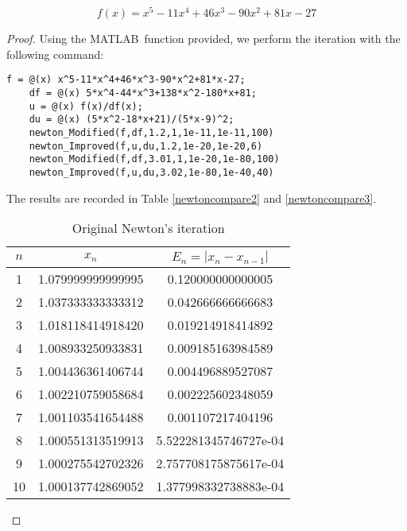 \begin{enumerate}
	\[ f(x)=x^5 - 11x^4 + 46x^3 - 90x^2 + 81x - 27 \]
	\begin{proof}
	Using the MATLAB\texttrademark\ function provided, we perform the iteration with the following command:
	\begin{lstlisting}[style=Matlab-editor]
	f = @(x) x^5-11*x^4+46*x^3-90*x^2+81*x-27;
	df = @(x) 5*x^4-44*x^3+138*x^2-180*x+81;
	u = @(x) f(x)/df(x);
	du = @(x) (5*x^2-18*x+21)/(5*x-9)^2;
	newton_Modified(f,df,1.2,1,1e-11,1e-11,100)
	newton_Improved(f,u,du,1.2,1e-20,1e-20,6)
	newton_Modified(f,df,3.01,1,1e-20,1e-80,100)
	newton_Improved(f,u,du,3.02,1e-80,1e-40,40)
	\end{lstlisting}
	The results are recorded in Table \ref{newtoncompare2} and \ref{newtoncompare3}.
	\ifnum{}
		\begin{table}[H]
		\centering
		\begin{subtable}[t]{.8\textwidth}
	\else
		\begin{table}[htbp]
		\begin{subtable}[t]{.49\linewidth}
	\fi	
			\centering
			\caption{Original Newton's iteration}
			\begin{tabular}[t]{|c|c|c|}
			\hline
			$n$	&	\(x_n\)				&	\(E_n=|x_n-x_{n-1}|\)	\\	\hline
			\footnotesize	1	&	\footnotesize	1.079999999999995	&	\footnotesize	0.120000000000005	\\	\hline
			\footnotesize	2	&	\footnotesize	1.037333333333312	&	\footnotesize	0.042666666666683	\\	\hline
			\footnotesize	3	&	\footnotesize	1.018118414918420	&	\footnotesize	0.019214918414892	\\	\hline
			\footnotesize	4	&	\footnotesize	1.008933250933831	&	\footnotesize	0.009185163984589	\\	\hline
			\footnotesize	5	&	\footnotesize	1.004436361406744	&	\footnotesize	0.004496889527087	\\	\hline
			\footnotesize	6	&	\footnotesize	1.002210759058684	&	\footnotesize	0.002225602348059	\\	\hline
			\footnotesize	7	&	\footnotesize	1.001103541654488	&	\footnotesize	0.001107217404196	\\	\hline
			\footnotesize	8	&	\footnotesize	1.000551313519913	&	\footnotesize	5.522281345746727e-04	\\	\hline
			\footnotesize	9	&	\footnotesize	1.000275542702326	&	\footnotesize	2.757708175875617e-04	\\	\hline
			\footnotesize	10	&	\footnotesize	1.000137742869052	&	\footnotesize	1.377998332738883e-04	\\	\hline

\end{tabular}
\end{subtable}
\end{table}
\end{subtable}
\end{table}
\end{proof}
\end{enumerate}
